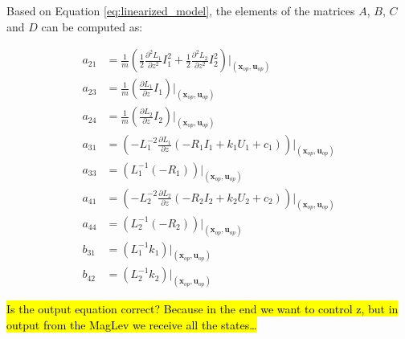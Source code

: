 Based on Equation \ref{eq:linearized_model}, the elements of the matrices $A$, $B$, $C$ and $D$ can be computed as:

\begin{equation}
    \begin{aligned}
        a_{21} & = \frac{1}{m} \left( \frac{1}{2} \frac{\partial^2 L_1}{\partial z^2} I_1^2 + \frac{1}{2} \frac{\partial^2 L_2}{\partial z^2} I_{2}^2 \right) \bigg|_{(\mathbf{x}_{op}, \mathbf{u}_{op})} \\
        a_{23} & = \frac{1}{m} \left( \frac{\partial L_1}{\partial z} I_1\right) \bigg|_{(\mathbf{x}_{op}, \mathbf{u}_{op})}                                                                              \\
        a_{24} & = \frac{1}{m} \left( \frac{\partial L_2}{\partial z} I_2\right) \bigg|_{(\mathbf{x}_{op}, \mathbf{u}_{op})}                                                                              \\
        a_{31} & = \left(- L_1^{-2} \frac{\partial L_1}{\partial z} \left(- R_1 I_1 + k_1 U_1 + c_1 \right) \right) \bigg|_{(\mathbf{x}_{op}, \mathbf{u}_{op})}                                           \\
        a_{33} & = \left(L_1^{-1} (-R_1) \right) \big|_{(\mathbf{x}_{op}, \mathbf{u}_{op})}                                                                                                               \\
        a_{41} & = \left(- L_2^{-2} \frac{\partial L_2}{\partial z} \left(- R_2 I_2 + k_2 U_2 + c_2 \right) \right) \bigg|_{(\mathbf{x}_{op}, \mathbf{u}_{op})}                                           \\
        a_{44} & = \left(L_2^{-1} (-R_2) \right) \big|_{(\mathbf{x}_{op}, \mathbf{u}_{op})}                                                                                                               \\
        b_{31} & = \left(L_1^{-1} k_1 \right) \big|_{(\mathbf{x}_{op}, \mathbf{u}_{op})}                                                                                                                  \\
        b_{42} & = \left(L_2^{-1} k_2 \right) \big|_{(\mathbf{x}_{op}, \mathbf{u}_{op})}
    \end{aligned}
    \label{eq:state_space_matrices}
\end{equation}

\hl{Is the output equation correct? Because in the end we want to control z, but in output from the MagLev we receive all the states\dots}


